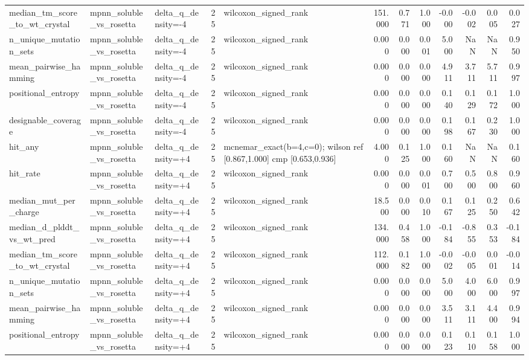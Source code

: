 \begin{table}
{\begin{tabular}{lllrlrrrrrrr}
median\_tm\_score\_to\_wt\_crystal & mpnn\_soluble\_vs\_rosetta & delta\_q\_density=-4 & 25 & wilcoxon\_signed\_rank & 151.000 & 0.771 & 1.000 & -0.000 & -0.002 & 0.005 & 0.027 \\
n\_unique\_mutation\_sets & mpnn\_soluble\_vs\_rosetta & delta\_q\_density=-4 & 25 & wilcoxon\_signed\_rank & 0.000 & 0.000 & 0.001 & 5.000 & NaN & NaN & 0.950 \\
mean\_pairwise\_hamming & mpnn\_soluble\_vs\_rosetta & delta\_q\_density=-4 & 25 & wilcoxon\_signed\_rank & 0.000 & 0.000 & 0.000 & 4.911 & 3.711 & 5.711 & 0.997 \\
positional\_entropy & mpnn\_soluble\_vs\_rosetta & delta\_q\_density=-4 & 25 & wilcoxon\_signed\_rank & 0.000 & 0.000 & 0.000 & 0.140 & 0.129 & 0.172 & 1.000 \\
designable\_coverage & mpnn\_soluble\_vs\_rosetta & delta\_q\_density=-4 & 25 & wilcoxon\_signed\_rank & 0.000 & 0.000 & 0.000 & 0.198 & 0.167 & 0.230 & 1.000 \\
hit\_any & mpnn\_soluble\_vs\_rosetta & delta\_q\_density=+4 & 25 & mcnemar\_exact(b=4,c=0); wilson ref [0.867,1.000] cmp [0.653,0.936] & 4.000 & 0.125 & 1.000 & 0.160 & NaN & NaN & 0.160 \\
hit\_rate & mpnn\_soluble\_vs\_rosetta & delta\_q\_density=+4 & 25 & wilcoxon\_signed\_rank & 0.000 & 0.000 & 0.001 & 0.700 & 0.500 & 0.800 & 0.960 \\
median\_mut\_per\_charge & mpnn\_soluble\_vs\_rosetta & delta\_q\_density=+4 & 25 & wilcoxon\_signed\_rank & 18.500 & 0.000 & 0.010 & 0.167 & 0.125 & 0.250 & 0.642 \\
median\_d\_plddt\_vs\_wt\_pred & mpnn\_soluble\_vs\_rosetta & delta\_q\_density=+4 & 25 & wilcoxon\_signed\_rank & 134.000 & 0.458 & 1.000 & -0.184 & -0.855 & 0.353 & -0.184 \\
median\_tm\_score\_to\_wt\_crystal & mpnn\_soluble\_vs\_rosetta & delta\_q\_density=+4 & 25 & wilcoxon\_signed\_rank & 112.000 & 0.182 & 1.000 & -0.002 & -0.005 & 0.001 & -0.014 \\
n\_unique\_mutation\_sets & mpnn\_soluble\_vs\_rosetta & delta\_q\_density=+4 & 25 & wilcoxon\_signed\_rank & 0.000 & 0.000 & 0.000 & 5.000 & 4.000 & 6.000 & 0.997 \\
mean\_pairwise\_hamming & mpnn\_soluble\_vs\_rosetta & delta\_q\_density=+4 & 25 & wilcoxon\_signed\_rank & 0.000 & 0.000 & 0.000 & 3.511 & 3.111 & 4.400 & 0.994 \\
positional\_entropy & mpnn\_soluble\_vs\_rosetta & delta\_q\_density=+4 & 25 & wilcoxon\_signed\_rank & 0.000 & 0.000 & 0.000 & 0.123 & 0.110 & 0.158 & 1.000 \\

\end{tabular}}
\end{table}
